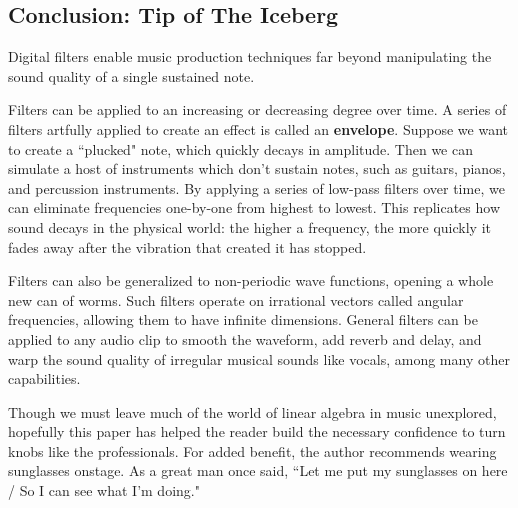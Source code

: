 \newpage

\subsection{Conclusion: Tip of The Iceberg}

\par \indentt Digital filters enable music production techniques far beyond manipulating the sound quality of a single sustained note.

\par \bigskip Filters can be applied to an increasing or decreasing degree over time. A series of filters artfully applied to create an effect is called an \textbf{envelope}. Suppose we want to create a ``plucked" note, which quickly decays in amplitude. Then we can simulate a host of instruments which don't sustain notes, such as guitars, pianos, and percussion instruments. By applying a series of low-pass filters over time, we can eliminate frequencies one-by-one from highest to lowest. This replicates how sound decays in the physical world: the higher a frequency, the more quickly it fades away after the vibration that created it has stopped.\cite{Pierce}

\par \bigskip Filters can also be generalized to non-periodic wave functions, opening a whole new can of worms. Such filters operate on irrational vectors called angular frequencies, allowing them to have infinite dimensions. General filters can be applied to any audio clip to smooth the waveform, add reverb and delay, and warp the sound quality of irregular musical sounds like vocals, among many other capabilities.\cite{Ryan}

\par \bigskip Though we must leave much of the world of linear algebra in music unexplored,  hopefully this paper has helped the reader build the necessary confidence to turn knobs like the professionals. For added benefit, the author recommends wearing sunglasses onstage. As a great man once said, ``Let me put my sunglasses on here / So I can see what I'm doing."